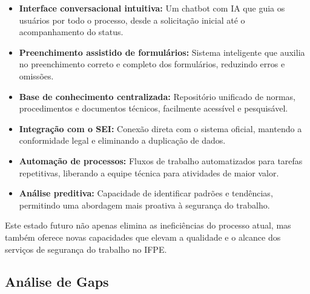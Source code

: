 \documentclass[12pt,a4paper]{article}
\begin{document}
\begin{itemize}
    \item \textbf{Interface conversacional intuitiva:} Um chatbot com IA que guia os usuários por todo o processo, desde a solicitação inicial até o acompanhamento do status.
    
    \item \textbf{Preenchimento assistido de formulários:} Sistema inteligente que auxilia no preenchimento correto e completo dos formulários, reduzindo erros e omissões.
    
    \item \textbf{Base de conhecimento centralizada:} Repositório unificado de normas, procedimentos e documentos técnicos, facilmente acessível e pesquisável.
    
    \item \textbf{Integração com o SEI:} Conexão direta com o sistema oficial, mantendo a conformidade legal e eliminando a duplicação de dados.
    
    \item \textbf{Automação de processos:} Fluxos de trabalho automatizados para tarefas repetitivas, liberando a equipe técnica para atividades de maior valor.
    
    \item \textbf{Análise preditiva:} Capacidade de identificar padrões e tendências, permitindo uma abordagem mais proativa à segurança do trabalho.
\end{itemize}

Este estado futuro não apenas elimina as ineficiências do processo atual, mas também oferece novas capacidades que elevam a qualidade e o alcance dos serviços de segurança do trabalho no IFPE.

\subsection{Análise de Gaps}
\end{document}
